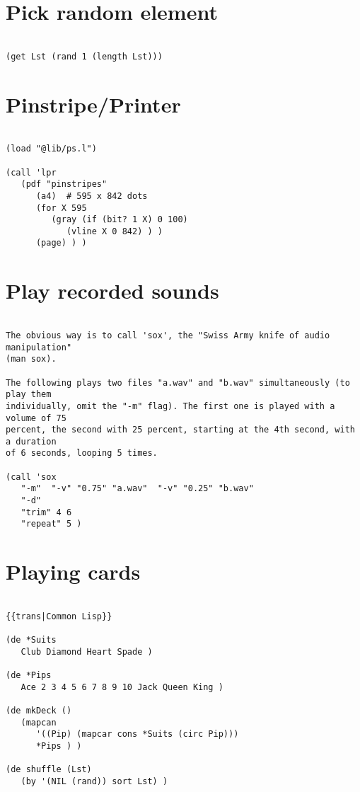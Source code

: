 \section*{Pick random element}

\begin{verbatim}

(get Lst (rand 1 (length Lst)))

\end{verbatim}

\section*{Pinstripe/Printer}

\begin{verbatim}

(load "@lib/ps.l")

(call 'lpr
   (pdf "pinstripes"
      (a4)  # 595 x 842 dots
      (for X 595
         (gray (if (bit? 1 X) 0 100)
            (vline X 0 842) ) )
      (page) ) )

\end{verbatim}

\section*{Play recorded sounds}

\begin{verbatim}

The obvious way is to call 'sox', the "Swiss Army knife of audio manipulation"
(man sox).

The following plays two files "a.wav" and "b.wav" simultaneously (to play them
individually, omit the "-m" flag). The first one is played with a volume of 75
percent, the second with 25 percent, starting at the 4th second, with a duration
of 6 seconds, looping 5 times.

(call 'sox
   "-m"  "-v" "0.75" "a.wav"  "-v" "0.25" "b.wav"
   "-d"
   "trim" 4 6
   "repeat" 5 )

\end{verbatim}

\section*{Playing cards}

\begin{verbatim}

{{trans|Common Lisp}}

(de *Suits
   Club Diamond Heart Spade )

(de *Pips
   Ace 2 3 4 5 6 7 8 9 10 Jack Queen King )

(de mkDeck ()
   (mapcan
      '((Pip) (mapcar cons *Suits (circ Pip)))
      *Pips ) )

(de shuffle (Lst)
   (by '(NIL (rand)) sort Lst) )

\end{verbatim}


